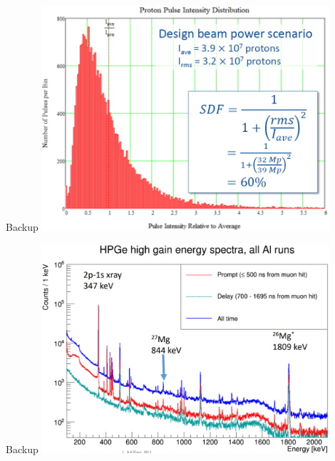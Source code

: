 \documentclass[10pt]{beamer}
\begin{document}
\begin{frame}{Backup}
\centering
\includegraphics[width=0.8\textwidth]{POT_distribution}
\end{frame}


\begin{frame}{Backup}
\centering
\includegraphics[width=0.8\textwidth]{HPG_Spectra}
\end{frame}
\end{document}
